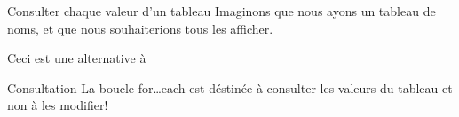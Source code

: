 \begin{frame}{Consulter chaque valeur d'un tableau}
    \pause
    Imaginons que nous ayons un tableau de noms, et que nous souhaiterions tous les afficher.
    

    \pause
    Ceci est une alternative à
    

    \pause
    \begin{alertblock}{Consultation}
        La boucle for\ldots each est déstinée à consulter les valeurs du tableau et non à les modifier!
    \end{alertblock}
\end{frame}